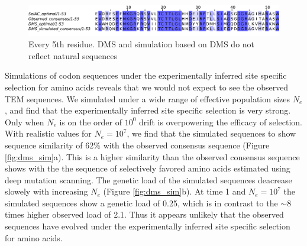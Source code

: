 \documentclass[12pt]{article}
\begin{document}
\begin{figure}[H]
     \centering
	\includegraphics[width=\textwidth]{img/seq_simil_short.pdf}
	\caption{Every 5th residue. DMS and simulation based on DMS do not reflect natural sequences}
	\label{fig:sim_seqs_cons}
\end{figure}

Simulations of codon sequences under the experimentally inferred site specific selection for amino acids reveals that we would not expect to see the observed TEM sequences.
We simulated under a wide range of effective population sizes $N_e$, and find that the experimentally inferred site specific selection is very strong.
Only when $N_e$ is on the order of $10^0$ drift is overpowering the efficacy of selection.
With realistic values for $N_e = 10^7$, we find that the simulated sequences to show sequence similarity of $62 \%$ with the observed consensus sequence (Figure \ref{fig:dms_sim}a).
This is a higher similarity than the observed consensus sequence shows with the the sequence of selectively favored amino acids estimated using deep mutation scanning.
The genetic load of the simulated sequences deacrease slowely with increasing $N_e$ (Figure \ref{fig:dms_sim}b).
At time 1 and $N_e = 10^7$ the simulated sequences show a genetic load of 0.25, which is in contrast to the $\sim 8$ times higher observed load of 2.1.
Thus it appears unlikely that the observed sequences have evolved under the experimentally inferred site specific selection for amino acids.
\end{document}

